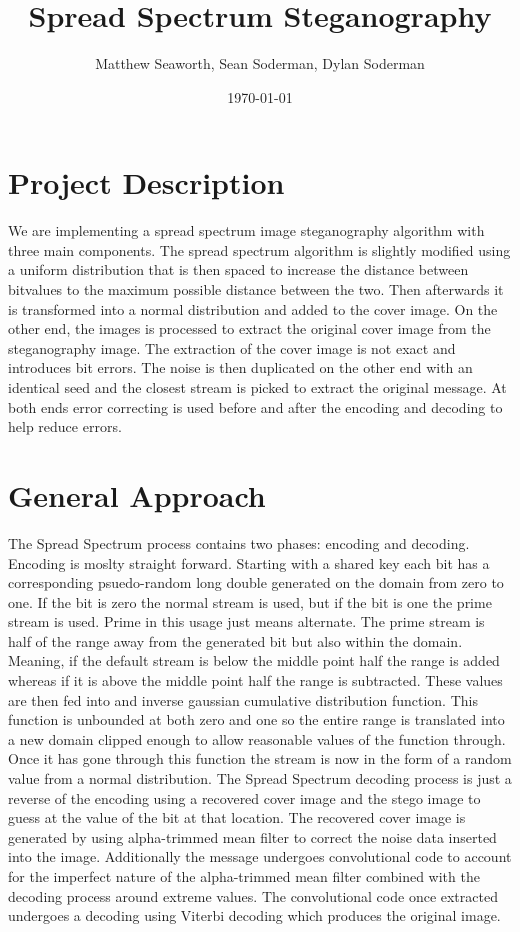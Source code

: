 \documentclass[11pt]{article}
\begin{document}
\title{Spread Spectrum Steganography}
\author{Matthew Seaworth, Sean Soderman, Dylan Soderman}
\date{\today}
\maketitle

\section{Project Description}
We are implementing a spread spectrum image steganography algorithm with three main components. The spread spectrum algorithm is slightly
modified using a uniform distribution that is then spaced to increase the distance between bitvalues to the maximum possible distance between
the two. Then afterwards it is transformed into a normal distribution and added to the cover image. On the other end, the images is processed
to extract the original cover image from the steganography image. The extraction of the cover image is not exact and introduces bit errors.
The noise is then duplicated on the other end with an identical seed and the closest stream is picked to extract the original message. At both
ends error correcting is used before and after the encoding and decoding to help reduce errors.


\section{General Approach}
\indent \indent The Spread Spectrum process contains two phases: encoding and decoding. Encoding is moslty straight forward. Starting with
a shared key each bit has a corresponding psuedo-random long double generated on the domain from zero to one. If the bit is zero the normal
stream is used, but if the bit is one the prime stream is used. Prime in this usage just means alternate. The prime stream is half of the range
away from the generated bit but also within the domain. Meaning, if the default stream is below the middle point half the range is added whereas if
it is above the middle point half the range is subtracted. These values are then fed into and inverse gaussian cumulative distribution function.
This function is unbounded at both zero and one so the entire range is translated into a new domain clipped enough to allow reasonable values of the
function through. Once it has gone through this function the stream is now in the form of a random value from a normal distribution. The Spread Spectrum
decoding process is just a reverse of the encoding using a recovered cover image and the stego image to guess at the value of the bit at that location.
The recovered cover image is generated by using alpha-trimmed mean filter to correct the noise data inserted into the image. Additionally the message undergoes
convolutional code to account for the imperfect nature of the alpha-trimmed mean filter combined with the decoding process around extreme values. The
convolutional code once extracted undergoes a decoding using Viterbi decoding which produces the original image.  \\
\end{document}
